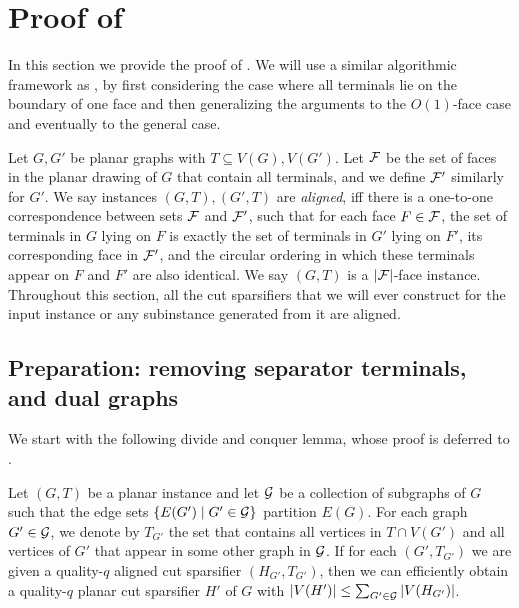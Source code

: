 \section{Proof of }
\label{sec: planar}

\newcommand{\gluepath}{{\mathsf{Glue}}}
\newcommand{\cutpath}{{\mathsf{Cut}}}

In this section we provide the proof of . We will use a similar algorithmic framework as \cite{chang2022near}, by first considering the case where all terminals lie on the boundary of one face and then generalizing the arguments to the $O(1)$-face case and eventually to the general case.

Let $G,G'$ be planar graphs with $T\subseteq V(G),V(G')$.
Let ${\mathcal{F}}$ be the set of faces in the planar drawing of $G$ that contain all terminals, and we define ${\mathcal{F}}'$ similarly for $G'$.
We say instances $(G,T),(G',T)$ are \emph{aligned}, iff there is a one-to-one correspondence between sets ${\mathcal{F}}$ and ${\mathcal{F}}'$, such that for each face $F\in {\mathcal{F}}$, the set of terminals in $G$ lying on $F$ is exactly the set of terminals in $G'$ lying on $F'$, its corresponding face in ${\mathcal{F}}'$, and the circular ordering in which these terminals appear on $F$ and $F'$ are also identical.
We say $(G,T)$ is a $|{\mathcal{F}}|$-face instance. Throughout this section, all the cut sparsifiers that we will ever construct for the input instance or any subinstance generated from it are aligned.

\subsection{Preparation: removing separator terminals, and dual graphs}

We start with the following divide and conquer lemma, whose proof is deferred to .

\begin{lemma}
\label{lem: divide}
Let $(G,T)$ be a planar instance and let ${\mathcal{G}}$ be a collection of subgraphs of $G$ such that the edge sets $\left\{ E(G') \mid G'\in {\mathcal{G}} \right\}$ partition $E(G)$. For each graph $G'\in {\mathcal{G}}$, we denote by $T_{G'}$ the set that contains all vertices in $T\cap V(G')$ and all vertices of $G'$ that appear in some other graph in ${\mathcal{G}}$.
If for each $(G',T_{G'})$ we are given a quality-$q$ aligned cut sparsifier $(H_{G'}, T_{G'})$, then we can efficiently obtain a quality-$q$ planar cut sparsifier $H'$ of $G$ with $|V(H')|\le \sum_{G'\in {\mathcal{G}}}|V(H_{G'})|$.
\end{lemma}

